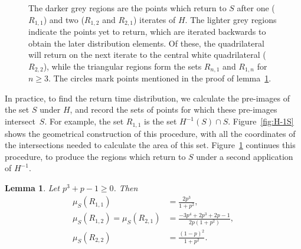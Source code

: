 \documentclass{iopart}
\newtheorem{lemma}{Lemma}
\begin{document}
%	

\begin{figure}
	\centering
	
	\caption{The darker grey regions are the points which return to $S$ after one ($R_{1,1}$) and two ($R_{1,2}$ and $R_{2,1}$) iterates of $H$. The lighter grey regions indicate the points yet to return, which are iterated backwards to obtain the later distribution elements. Of these, the quadrilateral will return on the next iterate to the central white quadrilateral ($R_{2,2}$), while the triangular regions form the sets $R_{n,1}$ and 
$R_{1,n}$ for $n \ge 3$. The circles mark points mentioned in the proof of lemma~\ref{lem:Rsets}.}
	\label{fig:R12}
\end{figure}

In practice, to find the return time distribution, we calculate the pre-images of the set $S$ under $H$, and record the sets of points for which these pre-images intersect~$S$. For example, the set $R_{1,1}$ is the set $H^{-1}(S) \cap S$. Figure~\ref{fig:H-1S} shows the geometrical construction of this procedure, with all the coordinates of the intersections needed to calculate the area of this set. Figure~\ref{fig:R12} continues this 
procedure, to produce the regions which return to $S$ under a second application of $H^{-1}$. 
\begin{lemma}\label{lem:Rsets}
Let $p^3 + p - 1 \ge 0$. Then
\begin{align*}
\mu_S (R_{1,1}) &= \frac{2p^3}{1+p^2}, \\
\mu_S (R_{1,2}) = \mu_S(R_{2,1}) & = \frac{-3p^4+2p^3+2p-1}{2p(1+p^2)}, \\
\mu_S(R_{2,2}) &= \frac{(1-p)^2}{1+p^2}.
\end{align*}
\end{lemma}
\end{document}
